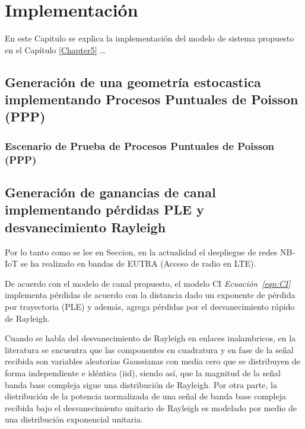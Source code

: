 
\chapter{Implementación} %

\label{Chapter6} %

En este Capitulo se explica la implementación del modelo de sistema propuesto en el Capítulo \ref{Chapter5} \ldots


\section{Generación de una geometría estocastica implementando Procesos Puntuales de Poisson (PPP)}


\subsection{Escenario de Prueba de Procesos Puntuales de Poisson (PPP)}



\section{Generación de ganancias de canal implementando pérdidas PLE y desvanecimiento Rayleigh}
Por lo tanto como se lee en Seccion, en la actualidad el despliegue de redes NB-IoT se ha realizado en bandas de EUTRA (Acceso de radio en LTE). 

De acuerdo con el modelo de canal propuesto, el modelo CI \textit{Ecuación~\ref{eqn:CI}} \parencite{Sun2016} implementa pérdidas de acuerdo con la distancia dado un exponente de pérdida por trayectoria (PLE) y además, agrega pérdidas por el desvanecimiento rápido de Rayleigh.

Cuando se habla del desvanecimiento de Rayleigh en enlaces inalambricos, en la literatura \parencite{RayleighScienceDirect} se encuentra que las componentes en cuadratura y en fase de la señal recibida son variables aleatorias Gaussianas con media cero que se distribuyen de forma independiente e idéntica (iid), siendo así, que la magnitud de la señal banda base compleja sigue una distribución de Rayleigh. Por otra parte, la distribución de la potencia normalizada de una señal de banda base compleja recibida bajo el desvanecimiento unitario de Rayleigh es modelado por medio de una distribución exponencial unitaria.\newline

